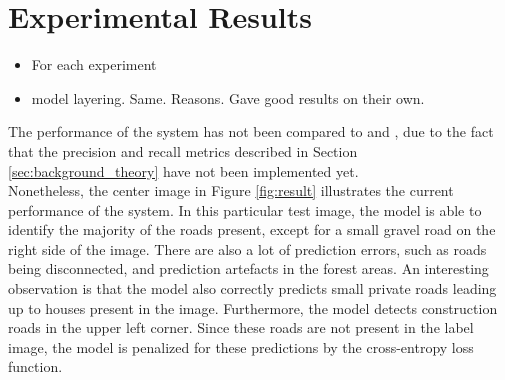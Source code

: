\section{Experimental Results}
\label{sec:experimentalResults}
\begin{itemize}
\item For each experiment
\item model layering. Same. Reasons. Gave good results on their own.
\end{itemize}


The performance of the system has not been compared to \citep{saito_building_and_roads} and \citep{Mnih_aerial_images_noisy}, due to the fact that the precision and recall metrics described in Section \ref{sec:background_theory} have not been implemented yet.\\

Nonetheless, the center image in Figure \ref{fig:result} illustrates the current performance of the system. In this particular test image, the model is able to identify the majority of the roads present, except for a small gravel road on the right side of the image. There are also a lot of prediction errors, such as roads being disconnected, and prediction artefacts in the forest areas. An interesting observation is that the model also correctly predicts small private roads leading up to houses present in the image. Furthermore, the model detects construction roads in the upper left corner. Since these roads are not present in the label image, the model is penalized for these predictions by the cross-entropy loss function.\\


